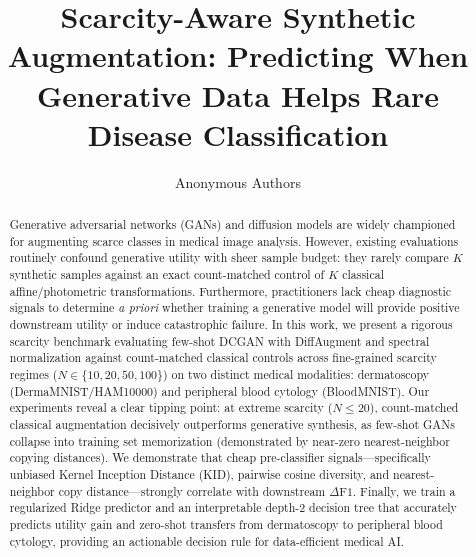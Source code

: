 \documentclass[runningheads]{llncs}
\begin{document}
\title{Scarcity-Aware Synthetic Augmentation: Predicting When Generative Data Helps Rare Disease Classification}

\author{Anonymous Authors}

\maketitle

\begin{abstract}
Generative adversarial networks (GANs) and diffusion models are widely championed for augmenting scarce classes in medical image analysis. However, existing evaluations routinely confound generative utility with sheer sample budget: they rarely compare $K$ synthetic samples against an exact count-matched control of $K$ classical affine/photometric transformations. Furthermore, practitioners lack cheap diagnostic signals to determine \textit{a priori} whether training a generative model will provide positive downstream utility or induce catastrophic failure. In this work, we present a rigorous scarcity benchmark evaluating few-shot DCGAN with DiffAugment and spectral normalization against count-matched classical controls across fine-grained scarcity regimes ($N \in \{10, 20, 50, 100\}$) on two distinct medical modalities: dermatoscopy (DermaMNIST/HAM10000) and peripheral blood cytology (BloodMNIST). Our experiments reveal a clear tipping point: at extreme scarcity ($N \le 20$), count-matched classical augmentation decisively outperforms generative synthesis, as few-shot GANs collapse into training set memorization (demonstrated by near-zero nearest-neighbor copying distances). We demonstrate that cheap pre-classifier signals---specifically unbiased Kernel Inception Distance (KID), pairwise cosine diversity, and nearest-neighbor copy distance---strongly correlate with downstream $\Delta\text{F1}$. Finally, we train a regularized Ridge predictor and an interpretable depth-2 decision tree that accurately predicts utility gain and zero-shot transfers from dermatoscopy to peripheral blood cytology, providing an actionable decision rule for data-efficient medical AI.
\end{abstract}

\end{document}
